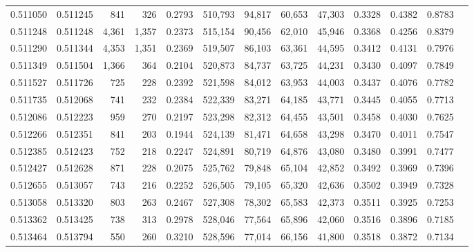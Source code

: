 \begin{tabular}{rrrrrrrrrrrrr}
0.511050 & 0.511245 &    841 &   326 &                                     0.2793 & 510,793 &  94,817 &  60,653 &  47,303 & 0.3328 & 0.4382 & 0.8783 \\
0.511248 & 0.511248 &  4,361 & 1,357 &                                     0.2373 & 515,154 &  90,456 &  62,010 &  45,946 & 0.3368 & 0.4256 & 0.8379 \\
0.511290 & 0.511344 &  4,353 & 1,351 &                                     0.2369 & 519,507 &  86,103 &  63,361 &  44,595 & 0.3412 & 0.4131 & 0.7976 \\
0.511349 & 0.511504 &  1,366 &   364 &                                     0.2104 & 520,873 &  84,737 &  63,725 &  44,231 & 0.3430 & 0.4097 & 0.7849 \\
0.511527 & 0.511726 &    725 &   228 &                                     0.2392 & 521,598 &  84,012 &  63,953 &  44,003 & 0.3437 & 0.4076 & 0.7782 \\
0.511735 & 0.512068 &    741 &   232 &                                     0.2384 & 522,339 &  83,271 &  64,185 &  43,771 & 0.3445 & 0.4055 & 0.7713 \\
0.512086 & 0.512223 &    959 &   270 &                                     0.2197 & 523,298 &  82,312 &  64,455 &  43,501 & 0.3458 & 0.4030 & 0.7625 \\
0.512266 & 0.512351 &    841 &   203 &                                     0.1944 & 524,139 &  81,471 &  64,658 &  43,298 & 0.3470 & 0.4011 & 0.7547 \\
0.512385 & 0.512423 &    752 &   218 &                                     0.2247 & 524,891 &  80,719 &  64,876 &  43,080 & 0.3480 & 0.3991 & 0.7477 \\
0.512427 & 0.512628 &    871 &   228 &                                     0.2075 & 525,762 &  79,848 &  65,104 &  42,852 & 0.3492 & 0.3969 & 0.7396 \\
0.512655 & 0.513057 &    743 &   216 &                                     0.2252 & 526,505 &  79,105 &  65,320 &  42,636 & 0.3502 & 0.3949 & 0.7328 \\
0.513058 & 0.513320 &    803 &   263 &                                     0.2467 & 527,308 &  78,302 &  65,583 &  42,373 & 0.3511 & 0.3925 & 0.7253 \\
0.513362 & 0.513425 &    738 &   313 &                                     0.2978 & 528,046 &  77,564 &  65,896 &  42,060 & 0.3516 & 0.3896 & 0.7185 \\
0.513464 & 0.513794 &    550 &   260 &                                     0.3210 & 528,596 &  77,014 &  66,156 &  41,800 & 0.3518 & 0.3872 & 0.7134 \\

\end{tabular}
